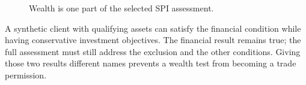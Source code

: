 \begin{figure}[H]
\centering
{}
\caption{Wealth is one part of the selected SPI assessment.}\label{fig:teach-P-01-problem-02}
\end{figure}

A synthetic client with qualifying assets can satisfy the financial condition while having conservative investment objectives. The financial result remains true; the full assessment must still address the exclusion and the other conditions. Giving those two results different names prevents a wealth test from becoming a trade permission.

